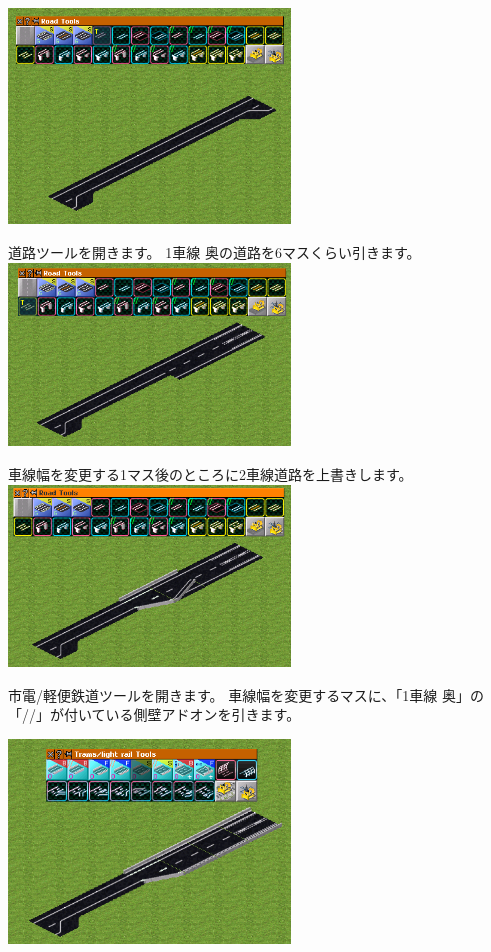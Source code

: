 \documentclass{jbook}
\begin{document}
\vspace{10pt}

\begin{multicols}{2}

\includegraphics[width = 75mm]{picture/20210214-road-5-1.png}

道路ツールを開きます。
1車線 奥の道路を6マスくらい引きます。\\

\includegraphics[width = 75mm]{picture/20210214-road-5-2.png}

車線幅を変更する1マス後のところに2車線道路を上書きします。\\

\includegraphics[width = 75mm]{picture/20210214-road-5-3.png}

市電/軽便鉄道ツールを開きます。
車線幅を変更するマスに、「1車線 奥」の「//」が付いている側壁アドオンを引きます。

\includegraphics[width = 75mm]{picture/20210214-road-5-4.png}


\end{multicols}
\end{document}
